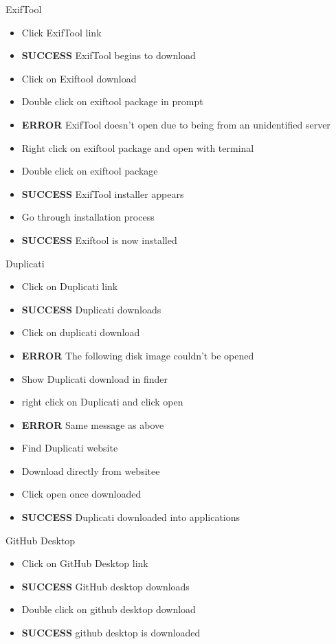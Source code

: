 \documentclass{article}
\begin{document}
ExifTool
\begin{itemize}
\item Click ExifTool link
\item \textbf{SUCCESS} ExifTool begins to download
\item Click on Exiftool download
\item Double click on exiftool package in prompt
\item \textbf{ERROR} ExifTool doesn't open due to being from an unidentified server
\item Right click on exiftool package and open with terminal
\item Double click on exiftool package
\item \textbf{SUCCESS} ExifTool installer appears
\item Go through installation process
\item \textbf{SUCCESS} Exiftool is now installed
\end{itemize}

Duplicati
\begin{itemize}
\item Click on Duplicati link 
\item \textbf{SUCCESS} Duplicati downloads
\item Click on duplicati download
\item \textbf{ERROR} The following disk image couldn't be opened
\item Show Duplicati download in finder
\item right click on Duplicati and click open
\item \textbf{ERROR} Same message as above
\item Find Duplicati website
\item Download directly from websitee
\item Click open once downloaded
\item \textbf{SUCCESS} Duplicati downloaded into applications
\end{itemize}

GitHub Desktop
\begin{itemize}
\item Click on GitHub Desktop link
\item \textbf{SUCCESS} GitHub desktop downloads
\item Double click on github desktop download
\item \textbf{SUCCESS} github desktop is downloaded
\end{itemize}
\end{document}

